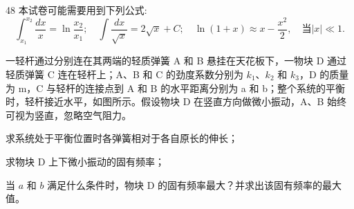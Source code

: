 \begin{problem}[第32届全国中学生物理竞赛决赛]{48}
本试卷可能需要用到下列公式:
\begin{equation}
\int_{x_{1}}^{x_{2}} \frac{dx}{x} = \ln \frac{x_{2}}{x_{1}}; \quad \int \frac{dx}{\sqrt{x}} = 2 \sqrt{x} + C; \quad \ln (1 + x) \approx x - \frac{x^{2}}{2}, \quad \text{当} |x| \ll 1.
\end{equation}

一轻杆通过分别连在其两端的轻质弹簧 A 和 B 悬挂在天花板下，一物块 D 通过轻质弹簧 C 连在轻杆上；A、B 和 C 的劲度系数分别为 $k_{1}$、$k_{2}$ 和 $k_{3}$，D 的质量为 m，C 与轻杆的连接点到 A 和 B 的水平距离分别为 a 和 b；整个系统的平衡时，轻杆接近水平，如图所示。假设物块 D 在竖直方向做微小振动，A、B 始终可视为竖直，忽略空气阻力。
\begin{subproblem}
求系统处于平衡位置时各弹簧相对于各自原长的伸长；
\end{subproblem}
\begin{subproblem}
求物块 D 上下微小振动的固有频率；
\end{subproblem}
\begin{subproblem}
当 $a$ 和 $b$ 满足什么条件时，物块 D 的固有频率最大？并求出该固有频率的最大值。
\end{subproblem}
\end{problem}